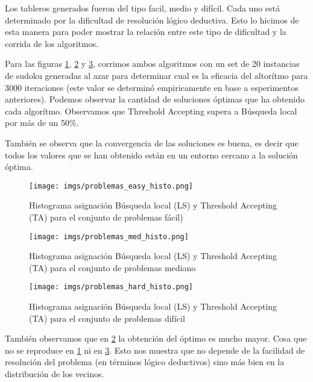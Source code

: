 \documentclass[a4paper,spanish]{article}
\begin{document}
Los tableros generados fueron del tipo facil, medio y difícil. Cada uno está
determinado por la dificultad de resolución lógico deductiva. Esto lo hicimos de
esta manera para poder mostrar la relación entre este tipo de dificultad y la
corrida de los algoritmos.

Para las figuras  \ref{img:histo_easy}, \ref{img:histo_med} y
\ref{img:histo_hard}, corrimos ambos algoritmos con un set de 20 instancias de
sudoku generadas al azar para determinar cual es la eficacia del altorítmo para
3000 iteraciones (este valor se determinó empiricamente en base a esperimentos
anteriores).
Podemos observar la cantidad de soluciones óptimas que ha obtenido cada
algorítmo. Observamos que Threshold Accepting supera a Búsqueda local por más de
un 50\%.

También se observa que la convergencia de las soluciones es buena, es decir que
todos los valores que se han obtenido están en un entorno cercano a la solución
óptima.


\begin{center}
    \begin{figure}
        \texttt{[image: imgs/problemas\_easy\_histo.png]}
        \caption{Histograma asignación Búsqueda local (LS) y Threshold
        Accepting (TA) para el conjunto de problemas fácil)}
        \label{img:histo_easy}
    \end{figure}
\end{center}
\begin{center}
    \begin{figure}
        \texttt{[image: imgs/problemas\_med\_histo.png]}
        \caption{Histograma asignación Búsqueda local (LS) y Threshold
        Accepting (TA) para el conjunto de problemas mediano}
        \label{img:histo_med}
    \end{figure}
\end{center}
\begin{center}
    \begin{figure}
        \texttt{[image: imgs/problemas\_hard\_histo.png]}
        \caption{Histograma asignación Búsqueda local (LS) y Threshold
        Accepting (TA) para el conjunto de problemas difícil}
        \label{img:histo_hard}
    \end{figure}
\end{center}

También observamos que en \ref{img:histo_med} la obtención del óptimo es mucho
mayor. Cosa que no se reproduce en \ref{img:histo_easy} ni en
\ref{img:histo_hard}. Esto nos muestra que no depende de la facilidad de
resolución del problema (en términos lógico deductivos) sino más bien en la
distribución de los vecinos.
\end{document}

